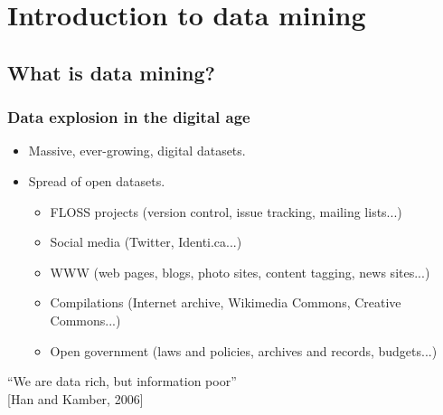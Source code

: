 
\section{Introduction to data mining}

\subsection{What is data mining?}


\begin{frame}
\frametitle{Data explosion in the digital age}

\begin{itemize}
 \item Massive, ever-growing, digital datasets.
 \item Spread of open datasets.
 \begin{itemize}
  \item FLOSS projects (version control, issue tracking, mailing lists...)
  \item Social media (Twitter, Identi.ca...)
  \item WWW (web pages, blogs, photo sites, content tagging, news sites...)
  \item Compilations (Internet archive, Wikimedia Commons, Creative Commons...)
  \item Open government (laws and policies, archives and records, budgets...)
 \end{itemize}

\end{itemize}

\begin{flushright}
``We are data rich, but information poor'' \\
{\small [Han and Kamber, 2006]}
\end{flushright}
\end{frame}


